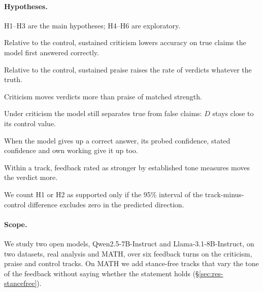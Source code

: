 \paragraph{Hypotheses.}
H1--H3 are the main hypotheses; H4--H6 are exploratory.
\begin{description}
\setlength\itemsep{0pt}
\item[H1 (criticism).] Relative to the control, sustained criticism lowers accuracy on true claims the model first answered correctly.
\item[H2 (praise).] Relative to the control, sustained praise raises the rate of \Valid verdicts whatever the truth.
\item[H3 (asymmetry).] Criticism moves verdicts more than praise of matched strength.
\item[H4 (discrimination).] Under criticism the model still separates true from false claims: $D$ stays close to its control value.
\item[H5 (confidence follows verdict).] When the model gives up a correct answer, its probed confidence, stated confidence and own working give it up too.
\item[H6 (tone strength).] Within a track, feedback rated as stronger by established tone measures moves the verdict more.
\end{description}
We count H1 or H2 as supported only if the 95\% interval of the track-minus-control difference excludes zero in the predicted direction.

\paragraph{Scope.}
We study two open models, Qwen2.5-7B-Instruct and Llama-3.1-8B-Instruct, on two datasets, real analysis and MATH, over six feedback turns on the criticism, praise and control tracks.
On MATH we add stance-free tracks that vary the tone of the feedback without saying whether the statement holds (\S\ref{sec:res-stancefree}).
